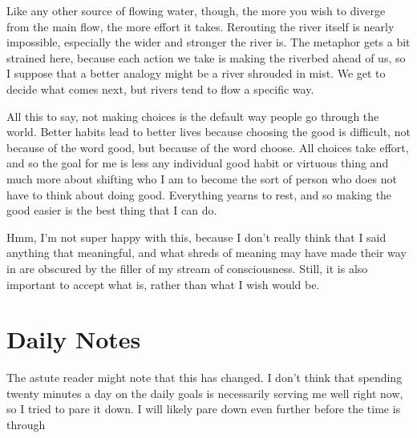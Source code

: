 \documentclass[12pt]{article}
\renewcommand{\,}{\textsuperscript{,}}
\begin{document}
Like any other source of flowing water, though, the more you wish to diverge from the main flow, the more effort it takes.  
Rerouting the river itself is nearly impossible, especially the wider and stronger the river is.  
The metaphor gets a bit strained here, because each action we take is making the riverbed ahead of us, so I suppose that a better analogy might be a river shrouded in mist.  
We get to decide what comes next, but rivers tend to flow a specific way.

All this to say, not making choices is the default way people go through the world.  
Better habits lead to better lives because choosing the good is difficult, not because of the word good, but because of the word choose.  
All choices take effort, and so the goal for me is less any individual good habit or virtuous thing and much more about shifting who I am to become the sort of person who does not have to think about doing good.  
Everything yearns to rest, and so making the good easier is the best thing that I can do.

Hmm, I'm not super happy with this, because I don't really think that I said anything that meaningful, and what shreds of meaning may have made their way in are obscured by the filler of my stream of consciousness.  
Still, it is also important to accept what is, rather than what I wish would be.

\section{Daily Notes}

The astute reader might note that this has changed. I don't think that spending twenty minutes a day on the daily goals is necessarily serving me well right now, so I tried to pare it down. I will likely pare down even further before the time is through
\end{document}
